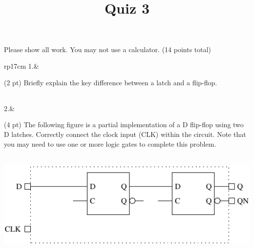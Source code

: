 \documentclass{article}
\title{Quiz 3}
\date{}
\begin{document}
\maketitle
Please show all work.  You may not use a calculator. (14 points total)
\begin{longtable}[l]{rp{17cm}}
1.&\begin{minipage}[t]{\linewidth}(2 pt) Briefly explain the key difference between a latch and a flip-flop. \\

\vspace{4cm
}
\end{minipage}\\
\medskip
2.&\begin{minipage}[t]{\linewidth}(4 pt) The following figure is a partial implementation of a D flip-flop using two D latches.  Correctly connect the clock input (CLK) within the circuit.  Note that you may need to use one or more logic gates to complete this problem. \\ \\
\begin{center}
  \includegraphics{../LatchesAndFlipFlops/Assessments/DFlipFlopLogicNoClock}
\end{center}


\end{minipage}
\end{longtable}
\end{document}
